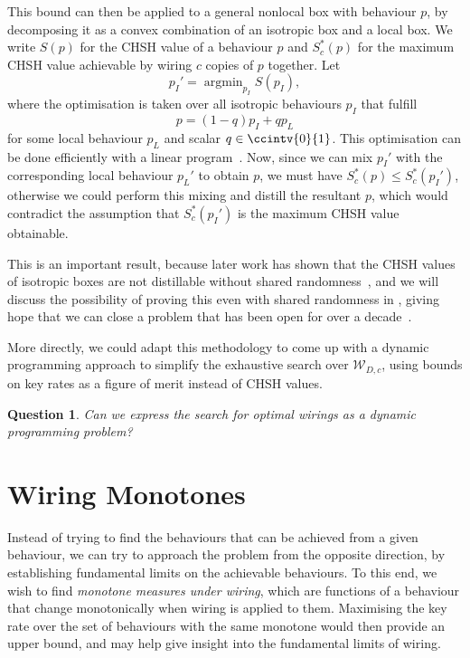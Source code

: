 \documentclass[10pt, a4paper]{article}
\numberwithin{equation}{section} %
\theoremstyle{definition}
\theoremstyle{plain}
\newtheorem{question}{Question}
\DeclareMathOperator*{\argmin}{argmin}
\newcommand{\?}{\mathrel{?}} %
\newcommand{\sW}{\mathcal{W}}
\begin{document}
                        This bound can then be applied to a general nonlocal box with behaviour \(p\), by decomposing it as a convex combination of an isotropic box and a local box. We write \(S(p)\) for the CHSH value of a behaviour \(p\) and \(S^*_c(p)\) for the maximum CHSH value achievable by wiring \(c\) copies of \(p\) together. Let
                        \begin{equation} p_I' = \argmin_{p_I} S(p_I), \end{equation}
                        where the optimisation is taken over all isotropic behaviours \(p_I\) that fulfill
                        \begin{equation} p = (1-q)p_I + qp_L \end{equation}
                        for some local behaviour \(p_L\) and scalar \(q \in\ccintv{0}{1}\). This optimisation can be done efficiently with a linear program~\cite{LocalPartLP}. Now, since we can mix \(p_I'\) with the corresponding local behaviour \(p_L'\) to obtain \(p\), we must have \(S^*_c(p) \leq S^*_c(p_I')\), otherwise we could perform this mixing and distill the resultant \(p\), which would contradict the assumption that \(S^*_c(p_I')\) is the maximum CHSH value obtainable.

                        This is an important result, because later work has shown that the CHSH values of isotropic boxes are not distillable without shared randomness~\cite{NLMonotones}, and we will discuss the possibility of proving this even with shared randomness in , giving hope that we can close a problem that has been open for over a decade~\cite{NLLimits, DistillationBounds}.

                        More directly, we could adapt this methodology to come up with a dynamic programming approach to simplify the exhaustive search over \(\sW_{D,c}\), using bounds on key rates as a figure of merit instead of CHSH values.
                        \begin{question}
                          Can we express the search for optimal wirings as a dynamic programming problem?
                        \end{question}

                        \section{Wiring Monotones}\label{sec:wirmono}

                        Instead of trying to find the behaviours that can be achieved from a given behaviour, we can try to approach the problem from the opposite direction, by establishing fundamental limits on the achievable behaviours. To this end, we wish to find \emph{monotone measures under wiring}, which are functions of a behaviour that change monotonically when wiring is applied to them. Maximising the key rate over the set of behaviours with the same monotone would then provide an upper bound, and may help give insight into the fundamental limits of wiring.
\end{document}
